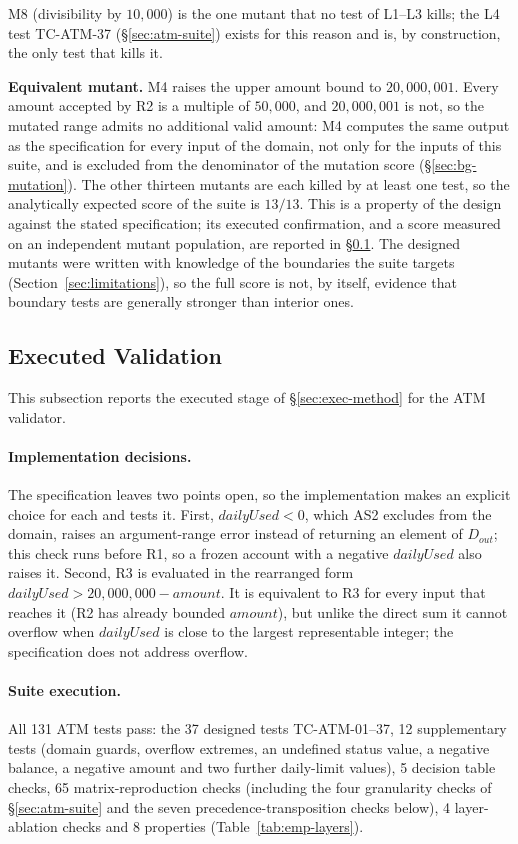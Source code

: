 \documentclass[11pt,a4paper]{article}
\begin{document}
M8 (divisibility by \(10{,}000\)) is the one mutant that no test of L1--L3
kills; the L4 test TC-ATM-37 (\S\ref{sec:atm-suite}) exists for this reason
and is, by construction, the only test that kills it.

\textbf{Equivalent mutant.} M4 raises the upper amount bound to
\(20{,}000{,}001\). Every amount accepted by R2 is a multiple of
\(50{,}000\), and \(20{,}000{,}001\) is not, so the mutated range admits no
additional valid amount: M4 computes the same output as the specification for
every input of the domain, not only for the inputs of this suite, and is
excluded from the denominator of the mutation score (\S\ref{sec:bg-mutation}).
The other thirteen mutants are each killed by at least one test, so the
analytically expected score of the suite is \(13/13\). This is a property of
the design against the stated specification; its executed confirmation, and
a score measured on an independent mutant population, are reported in
\S\ref{sec:atm-exec}. The designed mutants were written with knowledge of the
boundaries the suite targets (Section~\ref{sec:limitations}), so the full
score is not, by itself, evidence that boundary tests are generally stronger
than interior ones.
\subsection{Executed Validation}
\label{sec:atm-exec}

This subsection reports the executed stage of \S\ref{sec:exec-method} for the
ATM validator.

\paragraph{Implementation decisions.} The specification leaves two points
open, so the implementation makes an explicit choice for each and tests it.
First, \(\mathit{dailyUsed}<0\), which AS2 excludes from the domain, raises
an argument-range error instead of returning an element of \(D_{out}\); this
check runs before R1, so a frozen account with a negative
\(\mathit{dailyUsed}\) also raises it. Second, R3 is evaluated in the
rearranged form \(\mathit{dailyUsed}>20{,}000{,}000-\mathit{amount}\). It is
equivalent to R3 for every input that reaches it (R2 has already bounded
\(\mathit{amount}\)), but unlike the direct sum it cannot overflow when
\(\mathit{dailyUsed}\) is close to the largest representable integer; the
specification does not address overflow.

\paragraph{Suite execution.} All 131 ATM tests pass: the 37 designed tests
TC-ATM-01--37, 12 supplementary tests (domain guards, overflow extremes, an
undefined status value, a negative balance, a negative amount and two
further daily-limit values), 5 decision table checks, 65 matrix-reproduction
checks (including the four granularity checks of \S\ref{sec:atm-suite} and the seven precedence-transposition checks below), 4
layer-ablation checks and 8 properties (Table~\ref{tab:emp-layers}).
\end{document}
